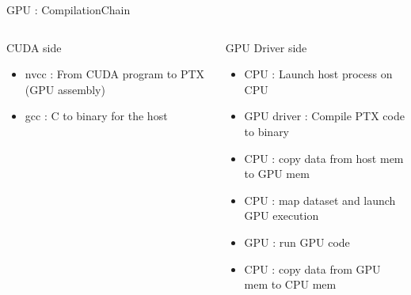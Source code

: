 \begin{Frame}{GPU : CompilationChain}
 \begin{columns}[t]
  \begin{column}{\BW}
    \begin{block}{CUDA side}
      \begin{itemize}
      \item nvcc : From CUDA program to PTX (GPU assembly)
      \item gcc : C to binary for the host
      \end{itemize}
    \end{block}
  \end{column}
  \begin{column}{\BW}
    \begin{block}{GPU Driver side}
      \begin{itemize}
      \item CPU : Launch host process on CPU
      \item GPU driver : Compile PTX code to binary
      \item CPU : copy data from host mem to GPU mem
      \item CPU : map dataset and launch GPU execution
      \item GPU : run GPU code
      \item CPU : copy data from GPU mem to CPU mem
      \end{itemize}
    \end{block}
  \end{column}

 \end{columns}
\end{Frame}
